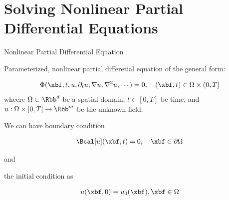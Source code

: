 \documentclass[aspectratio=169,xcolor=dvipsnames,svgnames,x11names,fleqn]{beamer}
\begin{document}
\section{Solving Nonlinear Partial Differential Equations}

\begin{frame}
 \sectionpage

\end{frame}

\begin{frame}{Nonlinear Partial Differential Equation}

\footnotesize

\begin{center}
  \begin{tcolorbox}[    enhanced,
    colback=softMint,
    colframe=borderLine,
    sharp corners,
    arc=0pt, 
    boxrule=0.4pt,
    leftrule=3pt,
    borderline west={5pt}{0pt}{highlightOrange}, 
    fontupper=\color{boxBackground},
    pad at break*=0mm,
    top=1pt, bottom=2pt, left=5pt, right=5pt]
    
    Parameterized, nonlinear partial differetial equation of the general form:
    
    \begin{align*}
    \Phi(\xbf, t, u, \partial_t u, \nabla u, \nabla^2 u, \cdots) = 0, \quad (\xbf, t)\in \Omega \times (0, T]
    \end{align*}
    wheere $\Omega \subset \Rbb^d$ be a spatial domain, $t \in [0, T]$ be time, and $ u: \Omega \times [0, T] \to \Rbb^m$ be the unknown field.
    
    We can have boundary condition 
    
    \begin{align*}
    \Bcal[u](\xbf, t) = 0, \quad \xbf \in \partial \Omega
    \end{align*}
    
    and 
    
    the initial condition as 
    
    \begin{align*}
    u(\xbf, 0) = u_0(\xbf), \xbf \in \Omega
    \end{align*}
    
    
    \end{tcolorbox}
\end{center}

\end{frame}
\end{document}
